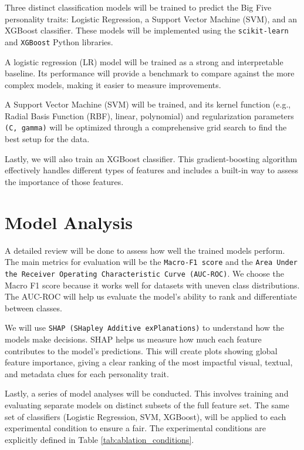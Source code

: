 Three distinct classification models will be trained to predict the Big Five personality traits: Logistic Regression, a Support Vector Machine (SVM), and an XGBoost classifier. These models will be implemented using the \texttt{scikit-learn} \citep{pedregosa2011} and \texttt{XGBoost} \citep{chen2016} Python libraries.

A logistic regression (LR) model will be trained as a strong and interpretable baseline. Its performance will provide a benchmark to compare against the more complex models, making it easier to measure improvements.

A Support Vector Machine (SVM) will be trained, and its kernel function (e.g., Radial Basis Function (RBF), linear, polynomial) and regularization parameters \texttt{(C, gamma)} will be optimized through a comprehensive grid search to find the best setup for the data.

Lastly, we will also train an XGBoost classifier. This gradient-boosting algorithm effectively handles different types of features and includes a built-in way to assess the importance of those features.

\section{Model Analysis}
\label{subsec:analysis}
A detailed review will be done to assess how well the trained models perform. The main metrics for evaluation will be the \texttt{Macro-F1 score} and the \texttt{Area Under the Receiver Operating Characteristic Curve (AUC-ROC)}. We choose the Macro F1 score because it works well for datasets with uneven class distributions. The AUC-ROC will help us evaluate the model's ability to rank and differentiate between classes.

We will use \texttt{SHAP (SHapley Additive exPlanations)} to understand how the models make decisions. SHAP helps us measure how much each feature contributes to the model's predictions. This will create plots showing global feature importance, giving a clear ranking of the most impactful visual, textual, and metadata clues for each personality trait.

Lastly, a series of model analyses will be conducted. This involves training and evaluating separate models on distinct subsets of the full feature set. The same set of classifiers (Logistic Regression, SVM, XGBoost), will be applied to each experimental condition to ensure a fair. The experimental conditions are explicitly defined in Table \ref{tab:ablation_conditions}.

